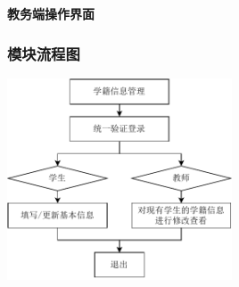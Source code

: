 \documentclass{article}
\begin{document}
\begin{center}
\textbf{教务端操作界面}
\end{center}

\subsubsection{模块流程图}
\begin{center}
\includegraphics[width=0.5\textwidth]{fig/student-status-flowchart.pdf}
\end{center}
\end{document}
